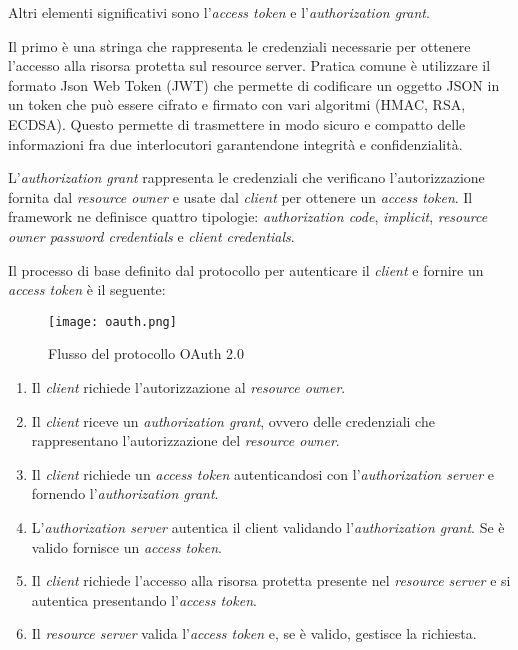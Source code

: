 Altri elementi significativi sono l'\textit{access token} e l'\textit{authorization grant}.

Il primo è una stringa che rappresenta le credenziali necessarie per ottenere l'accesso alla risorsa protetta sul resource server.
Pratica comune è utilizzare il formato Json Web Token\cite{rfc7519} (JWT) che permette di codificare un oggetto JSON in un token
che può essere cifrato e firmato con vari algoritmi (HMAC, RSA, ECDSA). Questo permette di trasmettere in modo sicuro e compatto delle informazioni
fra due interlocutori garantendone integrità e confidenzialità.

L'\textit{authorization grant} rappresenta le credenziali che verificano l'autorizzazione fornita dal \textit{resource owner} e usate dal \textit{client} per ottenere un \textit{access token}.
Il framework ne definisce quattro tipologie: \textit{authorization code}, \textit{implicit}, \textit{resource owner password credentials} e \textit{client credentials}.

Il processo di base definito dal protocollo per autenticare il \textit{client} e fornire un \textit{access token} è il seguente:
\begin{figure}[h]
    \centering
    \texttt{[image: oauth.png]}
    \caption{Flusso del protocollo OAuth 2.0}
    \label{fig:OAuth2.0}
\end{figure}

\begin{enumerate}
    \itemsep0em
    \item Il \textit{client} richiede l'autorizzazione al \textit{resource owner}.
    \item Il \textit{client} riceve un \textit{authorization grant}, ovvero delle credenziali che rappresentano l'autorizzazione del \textit{resource owner}.
    \item Il \textit{client} richiede un \textit{access token} autenticandosi con l'\textit{authorization server} e fornendo l'\textit{authorization grant}.
    \item L'\textit{authorization server} autentica il client validando l'\textit{authorization grant}. Se è valido fornisce un \textit{access token}.
    \item Il \textit{client} richiede l'accesso alla risorsa protetta presente nel \textit{resource server} e si autentica presentando l'\textit{access token}.
    \item Il \textit{resource server} valida l'\textit{access token} e, se è valido, gestisce la richiesta.
\end{enumerate}

